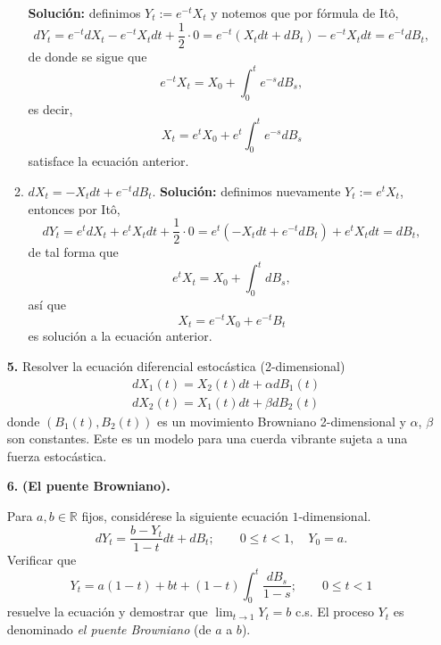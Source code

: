 \documentclass[letterpaper]{article}
\newcommand{\R}{\mathbb{R}}
\renewcommand{\to}{\rightarrow}
\newcommand{\1}{\mathds{1}}
\theoremstyle{definition}
\theoremstyle{definition}
\theoremstyle{definition}
\theoremstyle{definition}
\theoremstyle{definition}
\begin{document}
\begin{enumerate}
\begin{enumerate}
        \textbf{Solución:} definimos $Y_t:=e^{-t}X_t$ y notemos que por fórmula de Itô,
        \[
        dY_t=e^{-t}dX_t-e^{-t}X_tdt+\frac{1}{2}\cdot0 =e^{-t}(X_tdt+dB_t)-e^{-t}X_tdt=e^{-t}dB_t,
        \]
        de donde se sigue que 
        \[
        e^{-t}X_t=X_0+\int_{0}^{t}e^{-s}dB_s,    
        \]
        es decir, 
        \[
        X_t=e^{t}X_0+e^{t}\int_0^{t}e^{-s}dB_s    
        \]
        satisface la ecuación anterior.
        \item $dX_t=-X_tdt+e^{-t}dB_t$.
        \textbf{Solución:} definimos nuevamente $Y_t:=e^{t}X_t$, entonces por Itô, 
        \[
        dY_t=e^{t}dX_t+e^{t}X_tdt+\frac{1}{2}\cdot 0=e^{t}(-X_tdt+e^{-t}dB_t)+e^{t}X_tdt=dB_t,
        \]
        de tal forma que 
        \[
        e^{t}X_t=X_0+\int_{0}^{t}dB_s,    
        \]
        así que 
        \[
        X_t=e^{-t}X_0+e^{-t}B_t    
        \]
        es solución a la ecuación anterior.
    \end{enumerate}

    \item[\textbf{5.}] Resolver la ecuación diferencial estocástica (2-dimensional)
    \begin{align*}
        &dX_1(t)=X_2(t)dt+\alpha dB_1(t)\\
        &dX_2(t)=X_1(t)dt+\beta dB_2(t)
    \end{align*}
    donde $(B_1(t),B_2(t))$ es un movimiento Browniano 2-dimensional y $\alpha$, $\beta$ son constantes.
    Este es un modelo para una cuerda vibrante sujeta a una fuerza estocástica.
    \item[\textbf{6.}] \textbf{(El puente Browniano).}
    
    Para $a,b\in \R$ fijos, considérese la siguiente ecuación $1$-dimensional.
    \[
    dY_t=\frac{b-Y_t}{1-t}dt+dB_t; \qquad 0\leq t<1, \quad Y_0=a.    
    \]
    Verificar que 
    \[
    Y_t=a(1-t) + bt + (1-t)\int_{0}^{t}\frac{dB_s}{1-s}; \qquad 0\leq t <1    
    \]
    resuelve la ecuación y demostrar que $\displaystyle \lim_{t\to 1}Y_t=b$ c.s. El proceso 
    $Y_t$ es denominado \textit{el puente Browniano} (de $a$ a $b$).\\
    

\end{enumerate}
\end{document}
